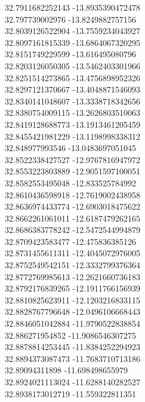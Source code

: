 {32.7911682252143	-13.8935390472478\\
32.797739002976	-13.8249882757156\\
32.8039126522904	-13.7559234043927\\
32.8097161815339	-13.6864067320295\\
32.8151749229599	-13.616495080796\\
32.8203126050305	-13.5462403301966\\
32.8251514273865	-13.4756898952326\\
32.8297121370667	-13.4048871546093\\
32.8340141048607	-13.3338718342656\\
32.8380754009115	-13.2626803510063\\
32.8419128688773	-13.1913461205459\\
32.8455421981229	-13.1198998338312\\
32.848977993546	-13.0483697051045\\
32.8522338427527	-12.9767816947972\\
32.8553223803889	-12.9051597100051\\
32.8582553495048	-12.833525784992\\
32.8610436598918	-12.7619002438958\\
32.8636974433774	-12.6903018475622\\
32.8662261061011	-12.6187479262165\\
32.8686383778242	-12.5472544994879\\
32.8709423583477	-12.475836385126\\
32.8731455611311	-12.4045072976005\\
32.8752549542151	-12.3332799376364\\
32.8772769985613	-12.2621660736183\\
32.8792176839265	-12.1911766156939\\
32.8810825623911	-12.1203216833115\\
32.8828767796648	-12.0496106668443\\
32.8846051042884	-11.9790522838854\\
32.886271954852	-11.9086546307275\\
32.8878814253445	-11.8384252294923\\
32.8894373087473	-11.7683710713186\\
32.89094311898	-11.698498655979\\
32.8924021113024	-11.6288140282527\\
32.8938173012719	-11.559322811351\\
}
